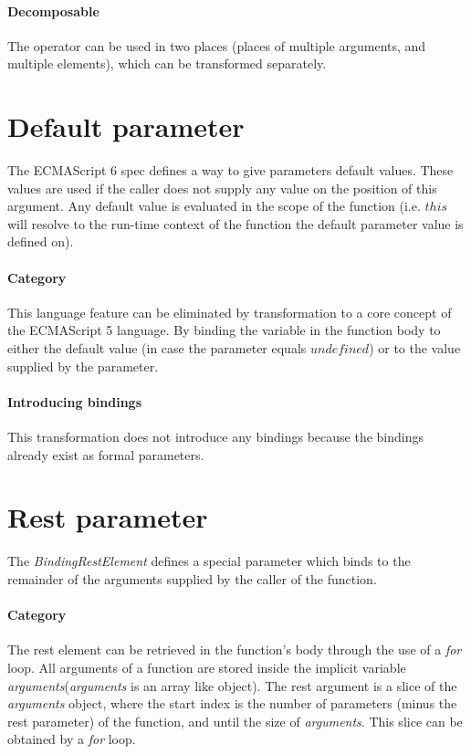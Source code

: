 \paragraph{Decomposable}
The operator can be used in two places (places of multiple arguments, and multiple elements), which can be transformed separately.

\section{Default parameter}
The ECMAScript 6 spec defines a way to give parameters default values\cite[9.2.12]{SpecJS}. These values are used if the caller does not supply any value on the position of this argument. Any default value is evaluated in the scope of the function (i.e. $this$ will resolve to the run-time context of the function the default parameter value is defined on).

\paragraph{Category}
This language feature can be eliminated by transformation to a core concept of the ECMAScript 5 language. By binding the variable in the function body to either the default value (in case the parameter equals $undefined$) or to the value supplied by the parameter.

\paragraph{Introducing bindings}
This transformation does not introduce any bindings because the bindings already exist as formal parameters.

\section{Rest parameter}
The \textit{BindingRestElement} defines a special parameter which binds to the remainder of the arguments supplied by the caller of the function.\cite[14.1]{SpecJS}

\paragraph{Category}
The rest element can be retrieved in the function's body through the use of a \textit{for} loop. All arguments of a function are stored inside the implicit variable \textit{arguments}\footnotemark (\textit{arguments} is an array like object). The rest argument is a slice of the \textit{arguments} object, where the start index is the number of parameters (minus the rest parameter) of the function, and until the size of \textit{arguments}. This slice can be obtained by a \textit{for} loop.

